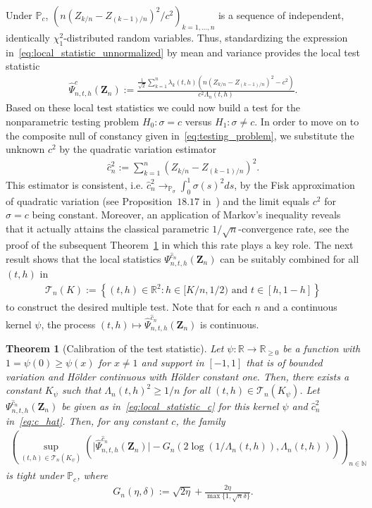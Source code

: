 \documentclass[10.5pt,letter]{article}
\numberwithin{equation}{section}
\newtheorem{theorem}{Theorem}[section]
\theoremstyle{definition}
\newcommand{\R}{\mathbb{R}}
\newcommand{\N}{\mathbb{N}}
\renewcommand{\P}{\mathbb{P}}
\newcommand{\1}{\mathbbm{1}}
\begin{document}
Under $\P_c$, $(n(Z_{k/n}-Z_{(k-1)/n})^2/c^2)_{k=1,\dots,n}$ is a sequence of independent, identically $\chi_1^2$-distributed random variables. Thus, standardizing the expression in~\eqref{eq:local_statistic_unnormalized} by mean and variance provides the local test statistic
\begin{align}\label{eq:local_statistic_c}
    \hat{\Psi}_{n,t,h}^c(\mathbf{Z}_n) := \frac{\frac{1}{\sqrt{2}}\sum_{k=1}^n \lambda_k(t,h)\left( n(Z_{k/n}-Z_{(k-1)/n})^2 - c^2\right)}{c^2 \Lambda_n(t,h)}.
\end{align}
Based on these local test statistics we could now build a test for the nonparametric testing problem $H_0:\sigma=c$ versus $H_1:\sigma\neq c$. In order to move on to the composite null of constancy given in~\eqref{eq:testing_problem}, we substitute the unknown $c^2$ by the quadratic variation estimator
\begin{align}\label{eq:c_hat}
    \hat{c}_n^2 := \sum_{k=1}^n \left( Z_{k/n}-Z_{(k-1)/n}\right)^2.
\end{align}
This estimator is consistent, i.e.  $\hat{c}_n^2\rightarrow_{\P_\sigma} \int_0^1 \sigma(s)^2ds$,
by the Fisk approximation of quadratic variation (see Proposition~$18.17$ in~\cite{Kallenberg}) and the limit equals $c^2$ for $\sigma=c$ being constant. Moreover, an application of Markov's inequality reveals that it actually attains the classical parametric $1/\sqrt{n}$-convergence rate, see the proof of the subsequent Theorem~\ref{thm:tightness} in which this rate plays a key role.
The next result shows that the local statistics $\Psi_{n,t,h}^{\hat{c}_n}(\mathbf{Z}_n)$ can be suitably combined for all $(t,h)$ in 
\begin{align*} 
    \mathcal{T}_n(K) := \left\{(t,h)\in\R^2: h\in [K/n,1/2) \textrm{ and } t\in [h,1-h] \right\}
\end{align*}
 to construct the desired multiple test. Note that for each $n$ and a continuous kernel $\psi$, the process $(t,h)\mapsto \hat{\Psi}_{n,t,h}^{\hat{c}_n}(\mathbf{Z}_n)$ is continuous.


\begin{theorem}[Calibration of the test statistic]\label{thm:tightness}
Let $\psi:\R\rightarrow \R_{\geq 0}$ be a function with $1=\psi(0)\geq\psi(x)$ for $x\neq 1$ and support in $[-1,1]$ that is of bounded variation and Hölder continuous with Hölder constant one.  Then, there exists a constant $K_\psi$ such that $\Lambda_n(t,h)^2\geq 1/n$ for all $(t,h)\in\mathcal{T}_n(K_\psi)$. Let $\Psi_{n,t,h}^{\hat{c}_n}(\mathbf{Z}_n)$ be given as in~\eqref{eq:local_statistic_c} for this kernel $\psi$ and $\hat{c}_n^2$ in~\eqref{eq:c_hat}. Then, for any  constant $c$, the family
\begin{align*}
  \left( \sup_{(t,h)\in\mathcal{T}_n(K_\psi)} \left(\big|\hat{\Psi}_{n,t,h}^{\hat{c}_n}(\mathbf{Z}_n)\big| - G_n\left(2\log(1/\Lambda_n(t,h)), \Lambda_n(t,h)\right)\right)\right)_{n\in\N}  
\end{align*}
is tight under $\P_c$, where
\begin{align*}
    G_n(\eta,\delta) := \sqrt{2\eta}+\frac{2\eta}{\max\{1,\sqrt{n}\delta\}}.
\end{align*}
\end{theorem}
\end{document}
